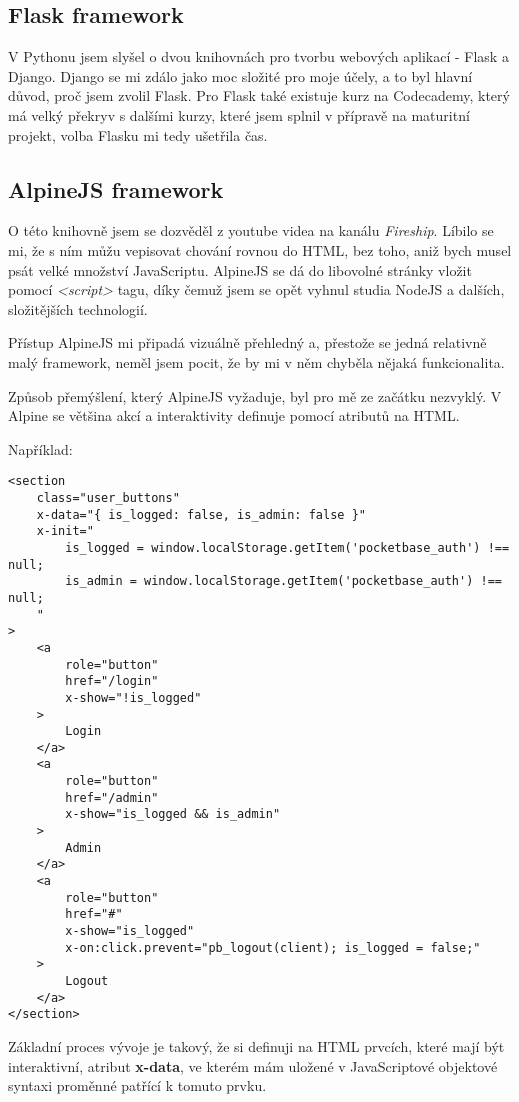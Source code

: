 \documentclass[11pt,a4paper,twoside,openright]{report}
\begin{document}
\subsection{Flask framework}
V Pythonu jsem slyšel o dvou knihovnách pro tvorbu webových aplikací - Flask a Django. Django se mi zdálo
jako moc složité pro moje účely, a to byl hlavní důvod, proč jsem zvolil Flask. Pro Flask také existuje
kurz na Codecademy, který má velký překryv s dalšími kurzy, které jsem splnil v přípravě na maturitní projekt,
volba Flasku mi tedy ušetřila čas.

\subsection{AlpineJS framework}
O této knihovně jsem se dozvěděl z youtube videa na kanálu \emph{Fireship}. Líbilo se mi, že s ním můžu
vepisovat chování rovnou do HTML, bez toho, aniž bych musel psát velké množství JavaScriptu. AlpineJS se
dá do libovolné stránky vložit pomocí \emph{<script>} tagu, díky čemuž jsem se opět vyhnul studia NodeJS
a dalších, složitějších technologií.

Přístup AlpineJS mi připadá vizuálně přehledný a, přestože se jedná relativně malý framework, neměl jsem
pocit, že by mi v něm chyběla nějaká funkcionalita.

Způsob přemýšlení, který AlpineJS vyžaduje, byl pro mě ze začátku nezvyklý. V Alpine se většina akcí a interaktivity
definuje pomocí atributů na HTML.

Například:

\begin{verbatim}
<section
	class="user_buttons"
	x-data="{ is_logged: false, is_admin: false }"
	x-init="
		is_logged = window.localStorage.getItem('pocketbase_auth') !== null;
		is_admin = window.localStorage.getItem('pocketbase_auth') !== null;
	"
>
    <a
    	role="button"
    	href="/login"
    	x-show="!is_logged"
    >
    	Login
    </a>
    <a
    	role="button"
    	href="/admin"
    	x-show="is_logged && is_admin"
    >
        Admin
    </a>
    <a
        role="button"
        href="#"
        x-show="is_logged"
        x-on:click.prevent="pb_logout(client); is_logged = false;"
    >
    	Logout
    </a>
</section>
\end{verbatim}

Základní proces vývoje je takový, že si definuji na HTML prvcích, které mají být interaktivní,
atribut \textbf{x-data}, ve kterém mám uložené v JavaScriptové objektové syntaxi proměnné patřící
k tomuto prvku.
\end{document}

